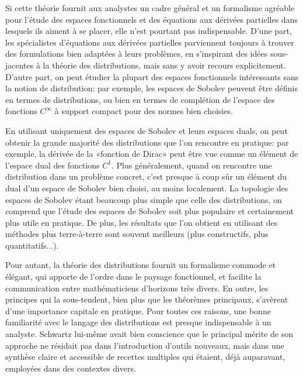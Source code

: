 \begin{histoire}
Si cette théorie fournit aux analystes un cadre général et un formalisme agréable pour l'étude des espaces fonctionnels et des équations aux dérivées partielles dans lesquels ils aiment à se placer, elle n'est pourtant pas indispensable.
D'une part, les spécialistes d'équations aux dérivées partielles parviennent toujours à trouver des formulations bien adaptées à leurs problèmes, en s'inspirant des idées sous-jacentes à la théorie des distributions, mais sans y avoir recours explicitement. D'autre part, on peut étudier la plupart des espaces fonctionnels intéressants sans la notion de distribution: par exemple, les espaces de Sobolev peuvent être définis en termes de  distributions, ou bien en termes de complétion de l'espace des fonctions $C^\infty$ à support compact pour des normes bien choisies. %

En utilisant uniquement des espaces de Sobolev et leurs espaces duals, on peut obtenir la grande majorité des distributions que l'on rencontre en pratique: par exemple, la dérivée de la «fonction de Dirac» peut être vue comme un élément de l'espace dual des fonctions $C^1$. Plus généralement, quand on rencontre une distribution dans un problème concret, c'est presque à coup sûr un élément du dual d'un espace de Sobolev bien choisi, au moins localement. La topologie des espaces de Sobolev étant beaucoup plus simple que celle des distributions, on comprend que l'étude des espaces de Sobolev soit plus populaire et certainement plus utile en pratique. De plus, les résultats que l'on obtient en utilisant des méthodes plus terre-à-terre sont souvent meilleurs (plus constructifs, plus quantitatifs...).

Pour autant, la théorie des distributions fournit un formalisme commode et élégant, qui apporte de l'ordre dans le paysage fonctionnel, et facilite la communication entre mathématiciens d'horizons très divers. En outre, les principes qui la sous-tendent, bien plus que les théorèmes principaux, s'avèrent d'une importance capitale en pratique. Pour toutes ces raisons, une bonne familiarité avec le langage des distributions est presque indispensable à un analyste. Schwartz lui-même avait bien conscience que le principal mérite de son approche ne résidait pas dans l'introduction d'outils nouveaux, mais dans une synthèse claire et accessible de recettes multiples qui étaient, déjà auparavant, employées dans des contextes divers.
\end{histoire}


